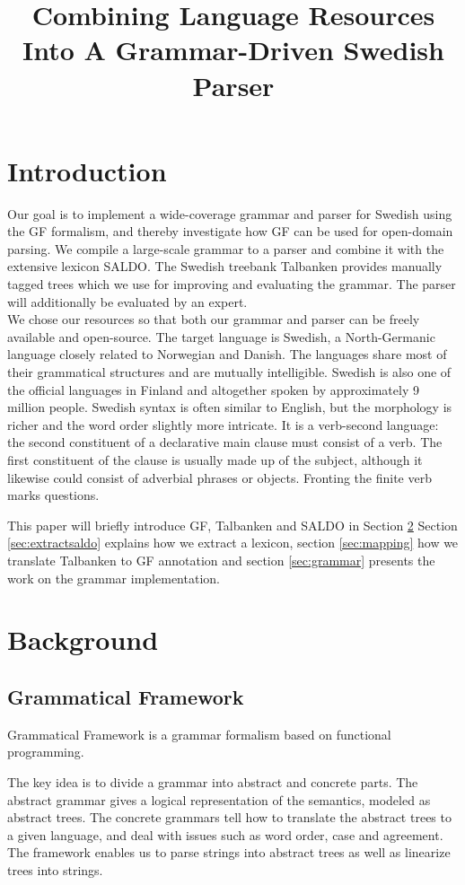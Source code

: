 \documentclass[10pt, a4paper]{article}
\title{Combining Language Resources Into A Grammar-Driven Swedish Parser}
\begin{document}
\maketitleabstract


\section{Introduction}
Our goal is to implement a wide-coverage grammar and parser for Swedish
using the GF formalism, and 
thereby investigate how GF can be used for open-domain parsing.
We compile a large-scale grammar to a parser
and combine it with the extensive lexicon SALDO. The Swedish treebank 
Talbanken provides manually tagged trees which we use for improving and evaluating
the grammar. The parser will additionally
be evaluated by an expert. \\
We chose our resources so that both our grammar and parser can 
be freely available and open-source. 
The target language is Swedish, a North-Germanic language
closely related to Norwegian and Danish. The languages share most of their
grammatical structures and are mutually intelligible. Swedish is also 
one of the official languages in Finland and altogether spoken by approximately 9
million people.
Swedish syntax is often similar to English, but the  morphology is richer and the
word order slightly more intricate.
It is a verb-second language: the second constituent of a declarative main
clause must consist of a verb.
The first constituent of the clause is usually made up of the subject,
although it likewise could consist of adverbial phrases or objects.
Fronting the finite verb marks questions.

This paper will briefly introduce GF, Talbanken and SALDO in Section \ref{sec:background}
Section \ref{sec:extractsaldo} explains how we extract a lexicon, section \ref{sec:mapping}
how we translate Talbanken to GF annotation and section \ref{sec:grammar}
presents the work on the grammar implementation.


\section{Background}
\label{sec:background}
\subsection{Grammatical Framework}
\label{sec:gf}


Grammatical Framework \cite{ranta-2011} is a grammar formalism based on
functional programming. 

The key idea is to divide a grammar into abstract and concrete parts. 
The abstract grammar gives a logical representation of the semantics,
modeled as abstract trees.
The concrete grammars tell how to translate the abstract trees to a given language,
and deal with issues such as word order, case and agreement. 
The framework enables us to parse strings into abstract trees as well as
linearize trees into strings.
\end{document}
